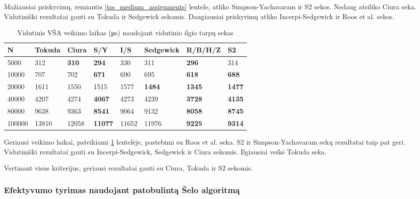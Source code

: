 \documentclass{VUMIFInfKursinis}
\begin{document}
Mažiausiai priskyrimų, remiantis \ref{tss_medium_assignments} lentele, atliko Simpson-Yachavaram ir S2 sekos.
Nedaug atsiliko Ciura seka.
Vidutiniški rezultatai gauti su Tokuda ir Sedgewick sekomis.
Daugiausiai priskyrimų atliko Incerpi-Sedgewick ir Roos et al. sekos.

\begin{table}[H]
  \caption{Vidutinis VŠA veikimo laikas (μs) naudojant vidutinio ilgio tarpų sekas}
  \label{tss_medium_runtimes}
  \begin{tabular}{|l|l|l|l|l|l|l|l|}
  \hline
  N      & Tokuda & Ciura        & S/Y            & I/S   & Sedgewick     & R/B/H/Z       & S2            \\ \hline
  5000   & 312    & \textbf{310} & \textbf{294}   & 330   & 311           & \textbf{296}  & 314           \\ \hline
  10000  & 707    & 702          & \textbf{671}   & 690   & 695           & \textbf{618}  & \textbf{688}  \\ \hline
  20000  & 1611   & 1550         & 1515           & 1577  & \textbf{1484} & \textbf{1345} & \textbf{1477} \\ \hline
  40000  & 4207   & 4274         & \textbf{4067}  & 4273  & 4239          & \textbf{3728} & \textbf{4135} \\ \hline
  80000  & 9638   & 9363         & \textbf{8541}  & 9064  & 9132          & \textbf{8058} & \textbf{8745} \\ \hline
  100000 & 13810  & 12058        & \textbf{11077} & 11652 & 11976         & \textbf{9225} & \textbf{9314} \\ \hline
  \end{tabular}
\end{table}

Geriausi veikimo laikai, pateikiami \ref{tss_medium_runtimes} lentelėje, pastebimi su Roos et al. seka.
S2 ir Simpson-Yachavaram sekų rezultatai taip pat geri.
Vidutiniški rezultatai gauti su Incerpi-Sedgewick, Sedgewick ir Ciura sekomis.
Ilgiausiai veikė Tokuda seka.

Vertinant visus kriterijus, geriausi rezultatai gauti su Ciura, Tokuda ir S2 sekomis.

\subsubsection{Efektyvumo tyrimas naudojant patobulintą Šelo algoritmą}
\end{document}

